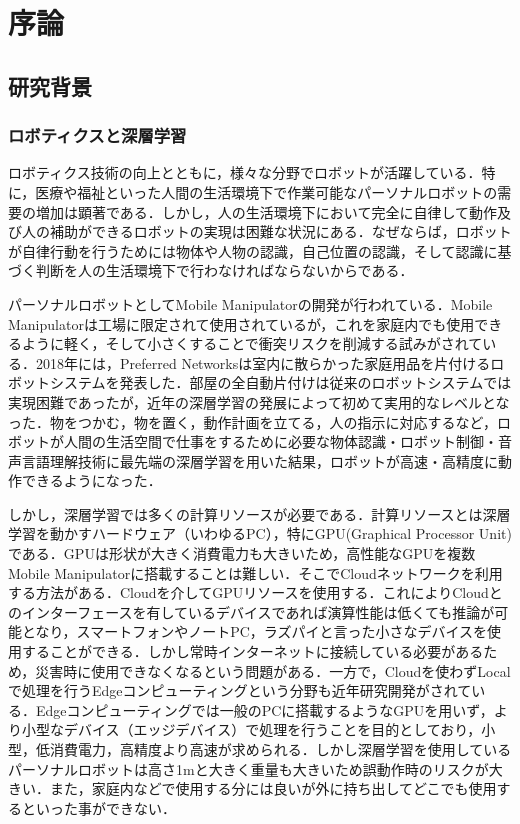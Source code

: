 \chapter{序論}
\label{chap_intro}
\newpage

\section{研究背景}
\subsection{ロボティクスと深層学習}
ロボティクス技術の向上とともに，様々な分野でロボットが活躍している．特に，医療や福祉といった人間の生活環境下で作業可能なパーソナルロボットの需要の増加は顕著である．しかし，人の生活環境下において完全に自律して動作及び人の補助ができるロボットの実現は困難な状況にある．なぜならば，ロボットが自律行動を行うためには物体や人物の認識，自己位置の認識，そして認識に基づく判断を人の生活環境下で行わなければならないからである．

パーソナルロボットとしてMobile Manipulatorの開発が行われている．Mobile Manipulatorは工場に限定されて使用されているが，これを家庭内でも使用できるように軽く，そして小さくすることで衝突リスクを削減する試みがされている．2018年には，Preferred Networksは室内に散らかった家庭用品を片付けるロボットシステムを発表した\cite{お片づけロボット}．部屋の全自動片付けは従来のロボットシステムでは実現困難であったが，近年の深層学習の発展によって初めて実用的なレベルとなった．物をつかむ，物を置く，動作計画を立てる，人の指示に対応するなど，ロボットが人間の生活空間で仕事をするために必要な物体認識・ロボット制御・音声言語理解技術に最先端の深層学習を用いた結果，ロボットが高速・高精度に動作できるようになった．

しかし，深層学習では多くの計算リソースが必要である．計算リソースとは深層学習を動かすハードウェア（いわゆるPC），特にGPU(Graphical Processor Unit)である．GPUは形状が大きく消費電力も大きいため，高性能なGPUを複数Mobile Manipulatorに搭載することは難しい．そこでCloudネットワークを利用する方法がある．Cloudを介してGPUリソースを使用する．これによりCloudとのインターフェースを有しているデバイスであれば演算性能は低くても推論が可能となり，スマートフォンやノートPC，ラズパイと言った小さなデバイスを使用することができる．しかし常時インターネットに接続している必要があるため，災害時に使用できなくなるという問題がある．一方で，Cloudを使わずLocalで処理を行うEdgeコンピューティングという分野も近年研究開発がされている．Edgeコンピューティングでは一般のPCに搭載するようなGPUを用いず，より小型なデバイス（エッジデバイス）で処理を行うことを目的としており，小型，低消費電力，高精度より高速が求められる．しかし深層学習を使用しているパーソナルロボットは高さ1mと大きく重量も大きいため誤動作時のリスクが大きい．また，家庭内などで使用する分には良いが外に持ち出してどこでも使用するといった事ができない．


